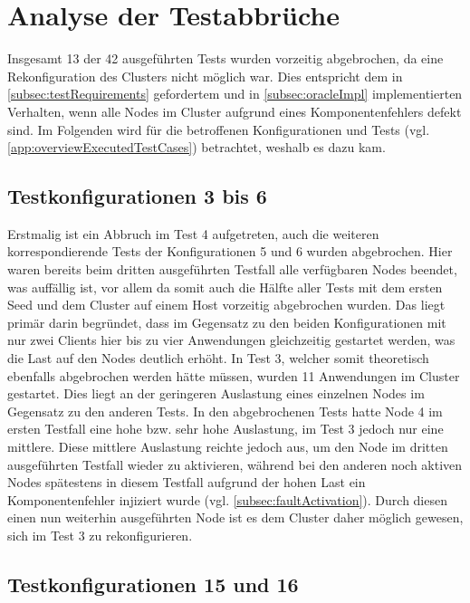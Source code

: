 \section{Analyse der Testabbrüche}
\label{sec:noReconfig}

Insgesamt 13 der 42 ausgeführten Tests wurden vorzeitig abgebrochen, da eine Rekonfiguration des Clusters nicht möglich war.
Dies entspricht dem in \cref{subsec:testRequirements} gefordertem und in \cref{subsec:oracleImpl} implementierten Verhalten, wenn alle Nodes im Cluster aufgrund eines Komponentenfehlers defekt sind.
Im Folgenden wird für die betroffenen Konfigurationen und Tests (vgl. \cref{app:overviewExecutedTestCases}) betrachtet, weshalb es dazu kam.

\subsection{Testkonfigurationen 3 bis 6}
\label{subsec:noReconf36}

Erstmalig ist ein Abbruch im Test 4 aufgetreten, auch die weiteren korrespondierende Tests der Konfigurationen 5 und 6 wurden abgebrochen.
Hier waren bereits beim dritten ausgeführten Testfall alle verfügbaren Nodes beendet, was auffällig ist, vor allem da somit auch die Hälfte aller Tests mit dem ersten Seed und dem Cluster auf einem Host vorzeitig abgebrochen wurden.
Das liegt primär darin begründet, dass im Gegensatz zu den beiden Konfigurationen mit nur zwei Clients hier bis zu vier Anwendungen gleichzeitig gestartet werden, was die Last auf den Nodes deutlich erhöht.
In Test 3, welcher somit theoretisch ebenfalls abgebrochen werden hätte müssen, wurden 11 Anwendungen im Cluster gestartet.
Dies liegt an der geringeren Auslastung eines einzelnen Nodes im Gegensatz zu den anderen Tests.
In den abgebrochenen Tests hatte Node 4 im ersten Testfall eine hohe bzw. sehr hohe Auslastung, im Test 3 jedoch nur eine mittlere.
Diese mittlere Auslastung reichte jedoch aus, um den Node im dritten ausgeführten Testfall wieder zu aktivieren, während bei den anderen noch aktiven Nodes spätestens in diesem Testfall aufgrund der hohen Last ein Komponentenfehler injiziert wurde (vgl. \cref{subsec:faultActivation}).
Durch diesen einen nun weiterhin ausgeführten Node ist es dem Cluster daher möglich gewesen, sich im Test 3 zu rekonfigurieren.

\subsection{Testkonfigurationen 15 und 16}
\label{subsec:noReconf1516}

